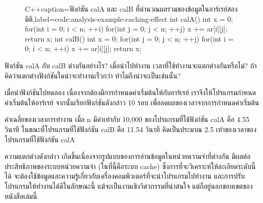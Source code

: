 \begin{figure}
\latintext
\begin{codelist}{C++}{caption={\thaitext ฟังก์ชัน {\ct calA} และ {\ct calB} ที่{\wbr}คำนวณ{\wbr}ผลรวม{\wbr}ของ{\wbr}ข้อมูล{\wbr}ใน{\wbr}อาร์เรย์{\wbr}สอง{\wbr}มิติ\latintext},label=code:analysis-example-caching-effect}
int calA()
{
  int x = 0;
  for(int i = 0; i < n; ++i)
    for(int j = 0; j < n; ++j)
      x += ar[i][j];
  return x;
}
int calB()
{
  int x = 0;
  for(int j = 0; j < n; ++j)
    for(int i = 0; i < n; ++i)
      x += ar[i][j];
  return x;
}
\end{codelist}
\thaitext
\end{figure}

\begin{quiz}{}
ฟังก์ชัน {\ct calA} กับ {\ct calB} ต่าง{\wbr}กัน{\wbr}อย่างไร?  เมื่อ{\wbr}นำ{\wbr}ไป{\wbr}ทำงาน{\wbr}
เวลา{\wbr}ที่{\wbr}ใช้{\wbr}ทำงาน{\wbr}จะ{\wbr}แตกต่าง{\wbr}กัน{\wbr}หรือ{\wbr}ไม่?  ถ้า{\wbr}คิด{\wbr}ว่า{\wbr}แตกต่าง{\wbr}ฟังก์ชัน{\wbr}ใด{\wbr}น่าจะ{\wbr}ทำงาน{\wbr}เร็ว{\wbr}กว่า{\wbr}
ทำไม{\wbr}ถึง{\wbr}น่าจะ{\wbr}เป็น{\wbr}เช่นนั้น?
\end{quiz}

เมื่อ{\wbr}นำ{\wbr}ฟังก์ชัน{\wbr}ไป{\wbr}ทดลอง เนื่องจาก{\wbr}ต้อง{\wbr}มี{\wbr}การ{\wbr}กำหนด{\wbr}ค่า{\wbr}เริ่มต้น{\wbr}ให้{\wbr}กับ{\wbr}อาร์เรย์
เรา{\wbr}จึง{\wbr}ให้{\wbr}โปรแกรม{\wbr}กำหนด{\wbr}ค่า{\wbr}เริ่มต้น{\wbr}ให้{\wbr}อาร์เรย์ จากนั้น{\wbr}เรียก{\wbr}ฟังก์ชัน{\wbr}ดังกล่าว 10 รอบ{\wbr}
เพื่อ{\wbr}ลด{\wbr}ผล{\wbr}ของ{\wbr}เวลา{\wbr}จาก{\wbr}การ{\wbr}กำหนด{\wbr}ค่า{\wbr}เริ่มต้น{\wbr}

ค่าเฉลี่ย{\wbr}ของ{\wbr}เวลา{\wbr}การ{\wbr}ทำงาน เมื่อ {\ct n} มี{\wbr}ค่า{\wbr}เท่า{\wbr}กับ 10,000 ของ{\wbr}โปรแกรม{\wbr}ที่{\wbr}ใช้{\wbr}ฟังก์ชัน{\wbr}
{\ct calA} คือ 4.55 วินาที ใน{\wbr}ขณะที่{\wbr}โปรแกรม{\wbr}ที่{\wbr}ใช้{\wbr}ฟังก์ชัน {\ct calB} คือ 11.54 วินาที{\wbr}
คิด{\wbr}เป็น{\wbr}ประมาณ 2.5 เท่า{\wbr}ของ{\wbr}เวลา{\wbr}ของ{\wbr}โปรแกรม{\wbr}ที่{\wbr}ใช้{\wbr}ฟังก์ชัน {\ct calA}

ความ{\wbr}แตกต่าง{\wbr}ดังกล่าว เกิด{\wbr}ขึ้น{\wbr}เนื่องจาก{\wbr}รูปแบบ{\wbr}ของ{\wbr}การ{\wbr}อ่าน{\wbr}ข้อมูล{\wbr}ใน{\wbr}หน่วยความจำ{\wbr}ที่{\wbr}ต่าง{\wbr}กัน{\wbr}
มี{\wbr}ผล{\wbr}ต่อ{\wbr}ประสิทธิภาพ{\wbr}ของ{\wbr}ระบบ{\wbr}หน่วยความจำ (ใน{\wbr}ที่นี้{\wbr}คือ{\wbr}ระบบ cache)
ซึ่ง{\wbr}การ{\wbr}ที่{\wbr}จะ{\wbr}วิเคราะห์{\wbr}ให้{\wbr}ละเอียด{\wbr}ระดับ{\wbr}นี้{\wbr}ได้{\wbr}
จะ{\wbr}ต้อง{\wbr}ใช้{\wbr}ข้อมูล{\wbr}และ{\wbr}ความ{\wbr}รู้{\wbr}เกี่ยวกับ{\wbr}เครื่อง{\wbr}คอมพิวเตอร์{\wbr}ที่{\wbr}จะ{\wbr}นำ{\wbr}โปรแกรม{\wbr}ไป{\wbr}ทำงาน{\wbr}
และ{\wbr}การ{\wbr}ปรับ{\wbr}โปรแกรม{\wbr}ให้{\wbr}ทำงาน{\wbr}ได้{\wbr}ดี{\wbr}ใน{\wbr}ลักษณะ{\wbr}นี้ แม้{\wbr}จะ{\wbr}เป็น{\wbr}งาน{\wbr}เชิง{\wbr}วิศวกรรม{\wbr}ที่{\wbr}น่า{\wbr}สนใจ{\wbr}
แต่{\wbr}ก็{\wbr}อยู่{\wbr}นอก{\wbr}ขอบเขต{\wbr}ของ{\wbr}หนังสือ{\wbr}เล่ม{\wbr}นี้{\wbr}

